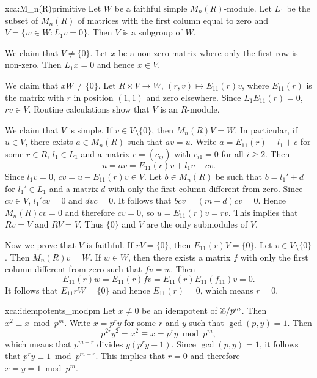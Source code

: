 
\begin{sol}{xca:M_n(R)primitive}
    Let $W$ be a faithful simple $M_n(R)$-module. Let 
    $L_1$ be the subset of $M_n(R)$ of matrices 
    with the first column equal to zero and 
    $V=\{w\in W:L_1v=0\}$. Then $V$ is a subgroup of $W$. 

    We claim that $V\ne\{0\}$. Let $x$ be 
    a non-zero matrix where only the first row is non-zero. Then 
    $L_1x=0$ and hence $x\in V$. 

    We claim that $xW\ne\{0\}$. 
    Let $R\times V\to W$, $(r,v)\mapsto E_{11}(r)v$, where $E_{11}(r)$ is the matrix 
    with $r$ in position $(1,1)$ and zero elsewhere. Since 
    $L_1E_{11}(r)=0$, $rv\in V$. Routine calculations show
    that $V$ is an $R$-module. 
    
    We claim that $V$ is simple. 
    If $v\in V\setminus\{0\}$, then 
    $M_n(R)V=W$. In particular, if $u\in V$, 
    there exists $a\in M_n(R)$ 
    such that $av=u$. Write $a=E_{11}(r)+l_1+c$ for
    some $r\in R$, $l_1\in L_1$ and a matrix 
    $c=(c_{ij})$ with $c_{i1}=0$ for all $i\geq2$. Then
    \[
    u=av=E_{11}(r)v+l_1v+cv.
    \]
    Since $l_1v=0$, $cv=u-E_{11}(r)v\in V$. Let $b\in M_n(R)$ 
    be such that $b=l_1'+d$ for $l_1'\in L_1$ and a matrix $d$
    with only the first column different from zero. Since $cv\in V$, 
    $l_1'cv=0$ and $dvc=0$. It follows that
    $bcv=(m+d)cv=0$. Hence $M_n(R)cv=0$ and 
    therefore $cv=0$, so $u=E_{11}(r)v=rv$. This implies that 
    $Rv=V$ and $RV=V$. Thus $\{0\}$ and $V$ are the only 
    submodules of $V$. 

    Now we prove that $V$ is faithful. If $rV=\{0\}$, then
    $E_{11}(r)V=\{0\}$. Let $v\in V\setminus\{0\}$. Then
    $M_n(R)v=W$. If $w\in W$, then there exists 
    a matrix $f$ with only the first column different from zero
    such that $fv=w$. Then
    \[
    E_{11}(r)w=E_{11}(r)fv=E_{11}(r)E_{11}(f_{11})v=0.
    \]
    It follows that $E_{11}rW=\{0\}$ and
    hence $E_{11}(r)=0$, which means $r=0$.
\end{sol}

\begin{sol}{xca:idempotents_modpm}
    Let $x\ne 0$ be an idempotent of $\mathbb{Z}/p^m$. Then $x^2\equiv x\bmod p^m$. 
    Write $x=p^ry$ for some $r$ and $y$ such that $\gcd(p,y)=1$. Then 
    \[
    p^{2r}y^2=x^2\equiv x=p^ry\bmod p^m,
    \]
    which means that $p^{m-r}$ divides $y(p^ry-1)$. Since 
    $\gcd(p,y)=1$, it follows that 
    $p^ry\equiv 1\bmod p^{m-r}$. This implies that $r=0$ and 
    therefore $x=y=1\bmod p^m$.
\end{sol}

